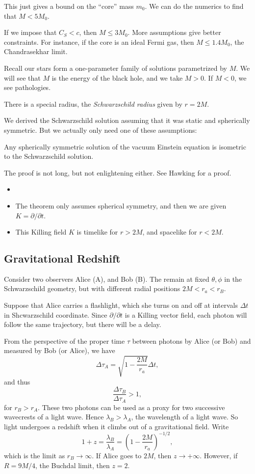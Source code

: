 \documentclass[12pt]{article}
\begin{document}
This just gives a bound on the ``core'' mass $m_0$. We can do the numerics to find that $M < 5 M_0$.

If we impose that $C_S < c$, then $M \leq 3 M_0$. More assumptions give better constraints. For instance, if the core is an ideal Fermi gas, then $M \leq 1.4 M_0$, the Chandrasekhar limit.


Recall our stars form a one-parameter family of solutions parametrized by $M$. We will see that $M$ is the energy of the black hole, and we take $M > 0$. If $M < 0$, we see pathologies.

There is a special radius, the \emph{Schwarzschild radius} given by $r = 2M$.

We derived the Schwarzschild solution assuming that it was static and spherically symmetric. But we actually only need one of these assumptions:
\begin{theorem}[Birkhoff]
	Any spherically symmetric solution of the vacuum Einstein equation is isometric to the Schwarzschild solution.
\end{theorem}
The proof is not long, but not enlightening either. See Hawking for a proof.
\begin{remark}
	\begin{itemize}
		\item[]
		\item The theorem only assumes spherical symmetry, and then we are given $K = \partial/\partial t$.
		\item This Killing field $K$ is timelike for $r > 2M$, and spacelike for $r < 2M$.
	\end{itemize}
\end{remark}

\subsection{Gravitational Redshift}%
\label{sub:grs}

Consider two observers Alice (A), and Bob (B). The remain at fixed $\theta, \phi$ in the Schwarzschild geometry, but with different radial positions $2M < r_a < r_B$.

Suppose that Alice carries a flashlight, which she turns on and off at intervals $\Delta t$ in Shcwarzschild coordinate. Since $\partial/ \partial t$ is a Killing vector field, each photon will follow the same trajectory, but there will be a delay.

From the perspective of the proper time $\tau$ between photons by Alice (or Bob) and measured by Bob (or Alice), we have
\[
	\Delta \tau_A = \sqrt{1 - \frac{2M}{r_a}} \Delta t,
\]
and thus
\[
\frac{\Delta \tau_B}{\Delta \tau_A} > 1,
\]
for $r_B > r_A$. These two photons can be used as a proxy for two successive wavecrests of a light wave. Hence $\lambda_B > \lambda_A$, the wavelength of a light wave. So light undergoes a redshift when it climbs out of a gravitational field. Write
\[
1 + z = \frac{\lambda_B}{\lambda_A} = \left(1 - \frac{2M}{r_a} \right)^{-1/2},
\]
which is the limit as $r_B \to \infty$. If Alice goes to $2M$, then $z \to +\infty$. However, if $R = 9M/4$, the Buchdal limit, then $z = 2$.
\end{document}
